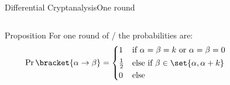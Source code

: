 \begin{frame}{Differential Cryptanalysis}{One round}
    \vspace{-30pt}
    \begin{columns}
        \begin{column}{0.58\textwidth}
            \centering
            \vspace{30pt}
            \begin{block}{Proposition}
                For one round of \bison/
                the probabilities are:
                \begin{equation*}
                    \Prob\bracket{\alpha \to \beta} = \begin{cases*}
                        1           & if $\alpha = \beta = k$ or $\alpha = \beta = 0$\\
                        \frac{1}{2} & else if $\beta \in \set{\alpha, \alpha + k}$\\
                        0           & else
                    \end{cases*}
                \end{equation*}
            \end{block}
        \end{column}
        \begin{column}{0.40\textwidth}
            \vspace{40pt}
            \centering
            \vfill
\end{column}
\end{columns}
\end{frame}
